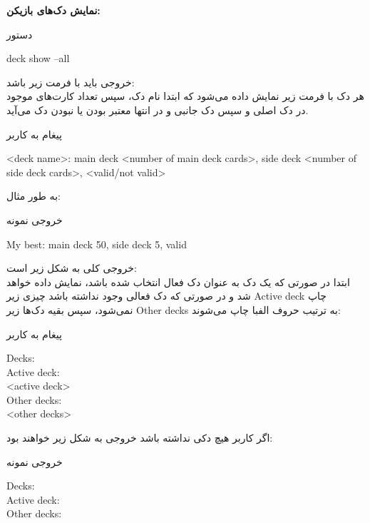 \documentclass[]{article}
\begin{document}
\textbf{نمایش دک‌های بازیکن:}
\begin{mybox}[colback=yellow]{دستور}
	\begin{latin}	
		deck show --all
	\end{latin}
\end{mybox}
خروجی باید با فرمت زیر باشد:
\\
هر دک با فرمت زیر نمایش داده می‌شود که ابتدا نام دک، سپس تعداد کارت‌های موجود 
در دک اصلی و سپس دک جانبی و در انتها معتبر بودن یا نبودن دک می‌آید.
\begin{mybox}[colback=yellow]{پیغام به کاربر}
	\begin{latin}	
		<deck name>: main deck <number of main deck cards>, side deck <number 
		of side deck cards>, <valid/not valid>
	\end{latin}
\end{mybox}
به طور مثال:
\begin{mybox}[colback=yellow]{خروجی نمونه}
	\begin{latin}	
		My best: main deck 50, side deck 5, valid
	\end{latin}
\end{mybox}
خروجی کلی به شکل زیر است:
\\
ابتدا در صورتی که یک دک به عنوان دک فعال انتخاب شده باشد، نمایش داده خواهد 
شد و در صورتی که دک فعالی وجود نداشته باشد چیزی زیر Active deck چاپ نمی‌شود، 
سپس بقیه دک‌ها زیر Other decks به ترتیب حروف الفبا چاپ می‌شوند:
\begin{mybox}[colback=yellow]{پیغام به کاربر}
	\begin{latin}	
		Decks: \\
		Active deck: \\
		<active deck> \\
		Other decks: \\
		<other decks>
	\end{latin}
\end{mybox}
اگر کاربر هیچ دکی نداشته باشد خروجی به شکل زیر خواهند بود:
\begin{mybox}[colback=yellow]{خروجی نمونه}
	\begin{latin}	
		Decks: \\
		Active deck: \\
		Other decks:
	\end{latin}
\end{mybox}
\end{document}
